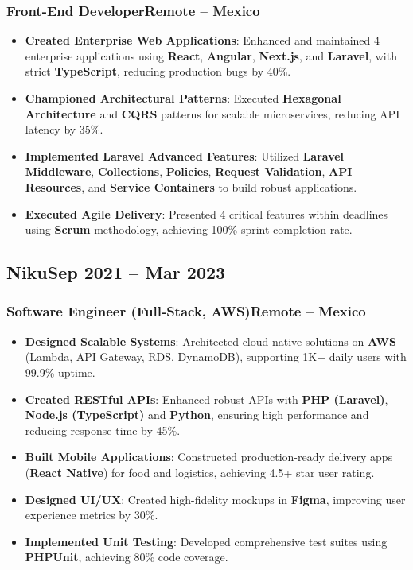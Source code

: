 \documentclass[a4paper,10pt]{article}
\newcommand{\kw}[1]{\textbf{\textcolor{keyword}{#1}}}
\newcommand{\tech}[1]{\textbf{\textcolor{tech}{#1}}}
\begin{document}
\subsubsection*{\small Front-End Developer\hfill Remote -- Mexico}
\begin{itemize}[noitemsep, leftmargin=*]
    \item \textbf{Created Enterprise Web Applications}: Enhanced and maintained 4 enterprise applications using \tech{React}, \tech{Angular}, \tech{Next.js}, and \tech{Laravel}, with strict \tech{TypeScript}, reducing production bugs by 40\%.
    \item \textbf{Championed Architectural Patterns}: Executed \kw{Hexagonal Architecture} and \kw{CQRS} patterns for scalable microservices, reducing API latency by 35\%.
    \item \textbf{Implemented Laravel Advanced Features}: Utilized \tech{Laravel Middleware}, \tech{Collections}, \tech{Policies}, \tech{Request Validation}, \tech{API Resources}, and \tech{Service Containers} to build robust applications.
    \item \textbf{Executed Agile Delivery}: Presented 4 critical features within deadlines using \kw{Scrum} methodology, achieving 100\% sprint completion rate.
\end{itemize}

\subsection*{\small Niku\hfill\textbf{Sep 2021 -- Mar 2023}}
\subsubsection*{\small Software Engineer (Full-Stack, AWS)\hfill Remote -- Mexico}
\begin{itemize}[noitemsep, leftmargin=*]
    \item \textbf{Designed Scalable Systems}: Architected cloud-native solutions on \tech{AWS} (Lambda, API Gateway, RDS, DynamoDB), supporting 1K+ daily users with 99.9\% uptime.
    \item \textbf{Created RESTful APIs}: Enhanced robust APIs with \tech{PHP (Laravel)}, \tech{Node.js (TypeScript)} and \tech{Python}, ensuring high performance and reducing response time by 45\%.
    \item \textbf{Built Mobile Applications}: Constructed production-ready delivery apps (\tech{React Native}) for food and logistics, achieving 4.5+ star user rating.
    \item \textbf{Designed UI/UX}: Created high-fidelity mockups in \tech{Figma}, improving user experience metrics by 30\%.
    \item \textbf{Implemented Unit Testing}: Developed comprehensive test suites using \tech{PHPUnit}, achieving 80\% code coverage.
\end{itemize}
\end{document}

